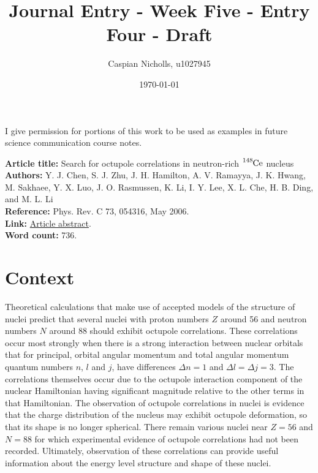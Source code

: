 \documentclass[12pt,a4paper]{article}
\begin{document}
\title{Journal Entry - Week Five - Entry Four - Draft}
\author{Caspian Nicholls, u1027945}
\date{\today}

\maketitle

\noindent
I give permission for portions of this work to be used as examples in future science communication course notes.

\medskip
\noindent
\textbf{Article title:} Search for octupole correlations in neutron-rich $\ce{^{148}Ce}$ nucleus \\
\textbf{Authors:} Y. J. Chen, S. J. Zhu, J. H. Hamilton, A. V. Ramayya, J. K. Hwang, M. Sakhaee, Y. X. Luo, J. O. Rasmussen, K. Li, I. Y. Lee, X. L. Che, H. B. Ding, and M. L. Li \\
\textbf{Reference:} Phys. Rev. C 73, 054316, May 2006. \\
\textbf{Link:}  \href{10.1103/PhysRevC.73.054316}{Article abstract}. \\
\textbf{Word count:} 736.

\section*{Context}
Theoretical calculations that make use of accepted models of the structure of nuclei predict that several nuclei with proton numbers $Z$ around 56 and neutron numbers $N$ around 88 should exhibit octupole correlations. These correlations occur most strongly when there is a strong interaction between nuclear orbitals that for principal, orbital angular momentum and total angular momentum quantum numbers $n$, $l$ and $j$, have differences $\Delta n = 1$ and $\Delta l = \Delta j = 3$. The correlations themselves occur due to the octupole interaction component of the nuclear Hamiltonian having significant magnitude relative to the other terms in that Hamiltonian. The observation of octupole correlations in nuclei is evidence that the charge distribution of the nucleus may exhibit octupole deformation, so that its shape is no longer spherical. There remain various nuclei near $Z = 56$ and $N = 88$ for which experimental evidence of octupole correlations had not been recorded. Ultimately, observation of these correlations can provide useful information about the energy level structure and shape of these nuclei.
\end{document}

